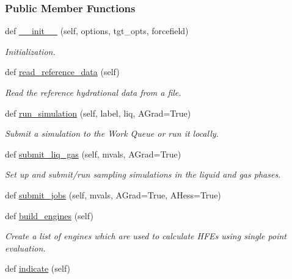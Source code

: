 \subsubsection*{Public Member Functions}
\begin{DoxyCompactItemize}
\item 
def \hyperlink{classsrc_1_1hydration_1_1Hydration_a367023ded700f1b67e3b26d3869c6c7b}{\+\_\+\+\_\+init\+\_\+\+\_\+} (self, options, tgt\+\_\+opts, forcefield)
\begin{DoxyCompactList}\small\item\em Initialization. \end{DoxyCompactList}\item 
def \hyperlink{classsrc_1_1hydration_1_1Hydration_ae5cf28d296c63f8cbd125880fbf8d123}{read\+\_\+reference\+\_\+data} (self)
\begin{DoxyCompactList}\small\item\em Read the reference hydrational data from a file. \end{DoxyCompactList}\item 
def \hyperlink{classsrc_1_1hydration_1_1Hydration_a6125922f50fa7e55aece75245d4b3cfb}{run\+\_\+simulation} (self, label, liq, A\+Grad=True)
\begin{DoxyCompactList}\small\item\em Submit a simulation to the Work Queue or run it locally. \end{DoxyCompactList}\item 
def \hyperlink{classsrc_1_1hydration_1_1Hydration_a7eb7a345cb235a28828b51fc092902c2}{submit\+\_\+liq\+\_\+gas} (self, mvals, A\+Grad=True)
\begin{DoxyCompactList}\small\item\em Set up and submit/run sampling simulations in the liquid and gas phases. \end{DoxyCompactList}\item 
def \hyperlink{classsrc_1_1hydration_1_1Hydration_a09b7d661320caa13bf94b198e4293156}{submit\+\_\+jobs} (self, mvals, A\+Grad=True, A\+Hess=True)
\item 
def \hyperlink{classsrc_1_1hydration_1_1Hydration_a8da7e34334a6872393258829726d2407}{build\+\_\+engines} (self)
\begin{DoxyCompactList}\small\item\em Create a list of engines which are used to calculate H\+F\+Es using single point evaluation. \end{DoxyCompactList}\item 
def \hyperlink{classsrc_1_1hydration_1_1Hydration_adbe65779ff1ec23208f16ee0a7392a97}{indicate} (self)

\end{DoxyCompactItemize}
